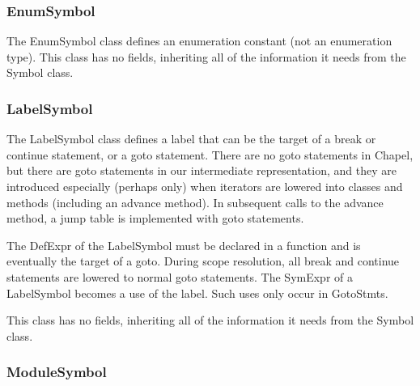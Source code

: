 \documentclass[10pt]{article}
\begin{document}
\subsubsection{EnumSymbol}
\label{sec:enumsymbol}

The EnumSymbol class defines an enumeration constant (not an
enumeration type).  This class has no fields, inheriting all of the
information it needs from the Symbol class.

\subsubsection{LabelSymbol}
\label{sec:labelsymbol}

The LabelSymbol class defines a label that can be the target of a
break or continue statement, or a goto statement.  There are no goto
statements in Chapel, but there are goto statements in our
intermediate representation, and they are introduced especially
(perhaps only) when iterators are lowered into classes and methods
(including an advance method).  In subsequent calls to the advance
method, a jump table is implemented with goto statements.

The DefExpr of the LabelSymbol must be declared in a function and is
eventually the target of a goto.  During scope resolution, all break
and continue statements are lowered to normal goto statements.  The
SymExpr of a LabelSymbol becomes a use of the label.  Such uses only
occur in GotoStmts.

This class has no fields, inheriting all of the information it needs
from the Symbol class.

\subsubsection{ModuleSymbol}
\label{sec:modulesymbol}
\end{document}
